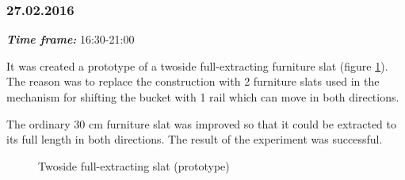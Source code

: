 \subsubsection{27.02.2016}
\textit{\textbf{Time frame:}} 16:30-21:00 

It was created a prototype of a twoside full-extracting furniture slat (figure \ref{Shiftbuc3.1}). The reason was to replace the construction with 2 furniture slats used in the mechanism for shifting the bucket with 1 rail which can move in both directions.

The ordinary 30 cm furniture slat was improved so that it could be extracted to its full length in both directions. The result of the experiment was successful. 

\begin{figure}[H]
	\begin{minipage}[h]{1\linewidth}
		\caption{Twoside full-extracting slat (prototype)}
		\label{Shiftbuc3.1}
	\end{minipage}
\end{figure}

